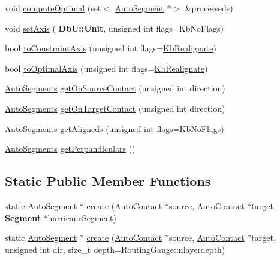 \begin{DoxyCompactItemize}
\item 
void \mbox{\hyperlink{classKatabatic_1_1AutoSegment_aa902247a1e967e52cc3ab087cd52b366}{compute\+Optimal}} (set$<$ \mbox{\hyperlink{classKatabatic_1_1AutoSegment}{Auto\+Segment}} $\ast$$>$ \&processeds)
\item 
void \mbox{\hyperlink{classKatabatic_1_1AutoSegment_a3881efebb7510d9b22e5f89bcd418954}{set\+Axis}} (\textbf{ Db\+U\+::\+Unit}, unsigned int flags=Kb\+No\+Flags)
\item 
bool \mbox{\hyperlink{classKatabatic_1_1AutoSegment_a8ab41a962e18810808f4f065863b5a73}{to\+Constraint\+Axis}} (unsigned int flags=\mbox{\hyperlink{namespaceKatabatic_a2af2ad6b6441614038caf59d04b3b217a45a219697151531a23e997b11118e08a}{Kb\+Realignate}})
\item 
bool \mbox{\hyperlink{classKatabatic_1_1AutoSegment_a750983d7154c94b54537127a3a18e14b}{to\+Optimal\+Axis}} (unsigned int flags=\mbox{\hyperlink{namespaceKatabatic_a2af2ad6b6441614038caf59d04b3b217a45a219697151531a23e997b11118e08a}{Kb\+Realignate}})
\item 
\mbox{\hyperlink{namespaceKatabatic_a2221b0ddbc24f331809fc86f98e38041}{Auto\+Segments}} \mbox{\hyperlink{classKatabatic_1_1AutoSegment_a4430f9704a59e1d4f7c37d7166649510}{get\+On\+Source\+Contact}} (unsigned int direction)
\item 
\mbox{\hyperlink{namespaceKatabatic_a2221b0ddbc24f331809fc86f98e38041}{Auto\+Segments}} \mbox{\hyperlink{classKatabatic_1_1AutoSegment_aadbb84c0f1383f6a2addc2661e388583}{get\+On\+Target\+Contact}} (unsigned int direction)
\item 
\mbox{\hyperlink{namespaceKatabatic_a2221b0ddbc24f331809fc86f98e38041}{Auto\+Segments}} \mbox{\hyperlink{classKatabatic_1_1AutoSegment_aaca749f49cd03ca06449d5ea2104033a}{get\+Aligneds}} (unsigned int flags=Kb\+No\+Flags)
\item 
\mbox{\hyperlink{namespaceKatabatic_a2221b0ddbc24f331809fc86f98e38041}{Auto\+Segments}} \mbox{\hyperlink{classKatabatic_1_1AutoSegment_aadc6427db83ebdb690e74980d9c8d7d8}{get\+Perpandiculars}} ()
\end{DoxyCompactItemize}
\subsection*{Static Public Member Functions}
\begin{DoxyCompactItemize}
\item 
static \mbox{\hyperlink{classKatabatic_1_1AutoSegment}{Auto\+Segment}} $\ast$ \mbox{\hyperlink{classKatabatic_1_1AutoSegment_ab0cc9e57beeceec519cd4bd3e415569e}{create}} (\mbox{\hyperlink{classKatabatic_1_1AutoContact}{Auto\+Contact}} $\ast$source, \mbox{\hyperlink{classKatabatic_1_1AutoContact}{Auto\+Contact}} $\ast$target, \textbf{ Segment} $\ast$hurricane\+Segment)
\item 
static \mbox{\hyperlink{classKatabatic_1_1AutoSegment}{Auto\+Segment}} $\ast$ \mbox{\hyperlink{classKatabatic_1_1AutoSegment_afa7ce652576b17985859fd6c29d21489}{create}} (\mbox{\hyperlink{classKatabatic_1_1AutoContact}{Auto\+Contact}} $\ast$source, \mbox{\hyperlink{classKatabatic_1_1AutoContact}{Auto\+Contact}} $\ast$target, unsigned int dir, size\+\_\+t depth=Routing\+Gauge\+::nlayerdepth)
\end{DoxyCompactItemize}
